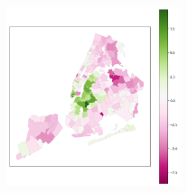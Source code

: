 \documentclass[conference]{IEEEtran}
\begin{document}
\clearpage
{}\label{app_b}
\begin{figure}[htbp]
\centerline{\includegraphics[width=0.45\textwidth]{images/gen_map.png}}
\end{figure}
\end{document}
